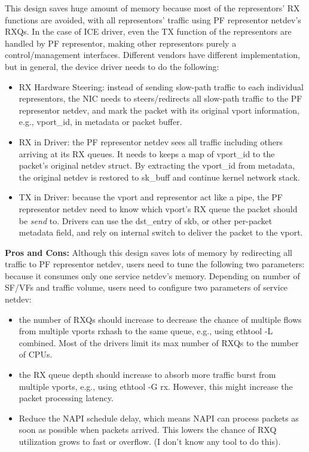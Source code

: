 \documentclass[letterpaper]{article}
\begin{document}
This design saves huge amount of memory because most of the representors'
RX functions are avoided, with all representors' traffic using PF representor
netdev's RXQs. In the case of ICE driver, even the TX
function of the representors are handled by PF representor, making other
representors purely a control/management interfaces.
Different vendors have different implementation, but in general,
the device driver needs to do the following:
\begin{itemize}
\item RX Hardware Steering: instead of sending slow-path traffic to
each individual representors, the NIC needs to steers/redirects all
slow-path traffic to the PF representor netdev, and mark the packet with
its original vport information, e.g., vport\_id, in metadata or packet buffer.
\item RX in Driver: the PF representor netdev sees all traffic including
others arriving at its RX queues. It needs to keeps a map of vport\_id
to the packet's original netdev struct. By extracting the vport\_id
from metadata, the original netdev is restored to sk\_buff and continue
kernel network stack.
\item TX in Driver: because the vport and representor act like a pipe,
the PF representor netdev need to know which vport's RX queue the packet
should be \emph{send} to. Drivers can use the dst\_entry of skb, or other
per-packet metadata field, and rely on internal switch to deliver the
packet to the vport.
\end{itemize}

\textbf{Pros and Cons:}
Although this design saves lots of memory by redirecting all traffic to
PF representor netdev, users need to tune the following two parameters:
because it consumes only one service
netdev's memory. Depending on number of SF/VFs and traffic volume,
users need to configure two parameters of service netdev:
\begin{itemize}
    \item the number of RXQs should increase to decrease the chance
    of multiple flows from multiple vports rxhash to the same queue,
    e.g., using ethtool -L combined. Most of the drivers limit its max number
    of RXQs to the number of CPUs.
    \item the RX queue depth should increase to absorb more traffic
    burst from multiple vports, e.g., using ethtool -G rx. However, this might
    increase the packet processing latency.
    \item Reduce the NAPI schedule delay, which means NAPI can process
    packets as soon as possible when packets arrived. This lowers the chance
    of RXQ utilization grows to fast or overflow. (I don't know any tool to do this).
\end{itemize}
\end{document}
